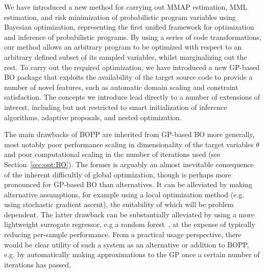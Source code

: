 
We have introduced a new method for carrying out MMAP estimation, MML estimation, and risk minimization
of probabilistic program variables using Bayesian optimization, representing the first unified framework for 
optimization and inference of probabilistic programs.  By using a series of code transformations, 
our method allows an arbitrary program to be optimized with respect to an arbitrary defined subset of its sampled variables, 
whilst marginalizing out the rest.  To carry out the required optimization, we have introduced a new GP-based 
BO package that exploits the availability of the target source code to provide a number of novel features, 
such as automatic domain scaling and constraint satisfaction.  
The concepts we introduce lead directly to a number of extensions of interest, including but not restricted 
to smart initialization of inference algorithms, adaptive proposals, and nested optimization.

The main drawbacks of BOPP are inherited from GP-based BO more generally,
most notably poor performance scaling in dimensionality of the target variables $\theta$ and poor 
computational scaling in the number of iterations used (see Section~\ref{sec:opt:BO}).  The former is 
arguably an almost inevitable consequence of the inherent difficultly of global optimization, though is perhaps
more pronounced for GP-based BO than alternatives.  It can be alleviated by making alternative
assumptions, for example using a local optimization method (e.g. using stochastic gradient ascent), the
suitability of which will be problem dependent.  The latter drawback can be substantially alleviated by using
a more lightweight surrogate regressor, e.g a random forest~\citep{hutter2011sequential}, 
at the expense of typically reducing per-sample performance.  From
a practical usage perspective, there would be clear utility of such a system as an alternative or addition to BOPP, e.g. by automatically
making approximations to the GP once a certain number of iterations has passed.


